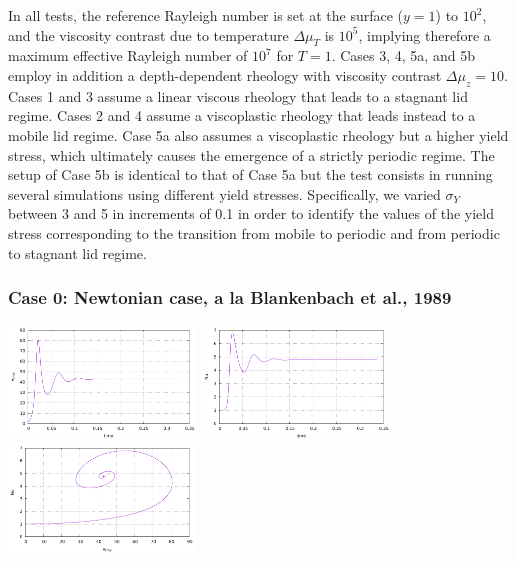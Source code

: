 In all tests, the reference Rayleigh number is set at the surface ($y=1$) to $10^2$, and the viscosity contrast due to temperature $\Delta\mu_T$ is $10^5$, implying therefore a maximum effective Rayleigh number of $10^7$ for $T=1$. Cases 3, 4, 5a, and 5b employ in addition a depth-dependent rheology with viscosity contrast  $\Delta\mu_z=10$. Cases 1 and 3 assume a linear viscous rheology that leads to a stagnant lid regime. Cases 2 and 4 assume a viscoplastic rheology that leads instead to a mobile lid regime. Case 5a also assumes a viscoplastic rheology but a higher yield stress, which ultimately causes the emergence of a strictly periodic regime. The setup of Case 5b is identical to that of Case 5a but the test consists in running several simulations using different yield stresses. Specifically, we varied $\sigma_Y$ between 3 and 5 in increments of 0.1 in order to identify the values of the yield stress corresponding to the transition from mobile to periodic and from periodic to stagnant lid regime. 

\subsubsection{Case 0: Newtonian case, a la Blankenbach et al., 1989}

\includegraphics[width=5cm]{python_codes/fieldstone_28/results_case0/vrms.pdf}
\includegraphics[width=5cm]{python_codes/fieldstone_28/results_case0/Nu.pdf}
\includegraphics[width=5cm]{python_codes/fieldstone_28/results_case0/vrms_Nu.pdf}

